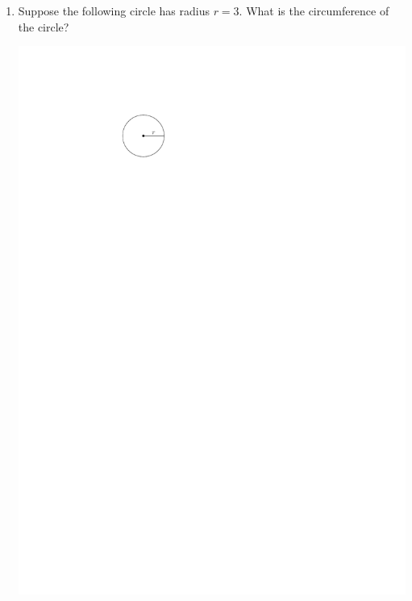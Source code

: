 \documentclass[12pt]{amsart}
\begin{document}
\begin{enumerate}
\begin{enumerate}
\end{enumerate}


\def \radi{3}\def \circumf{9}

 
\item Suppose the following circle has radius $r= \radi$. What is the circumference of the circle?
\vspace{2mm}

\includegraphics[scale = 0.8]{circle}

\vspace{1cm}
\newpage  $ $   \newpage\end{enumerate}\graphicspath{{/Users/jilan/Downloads/Randomizer/Randomizer/Sample Course/Sample Assessment/}}\setcounter{page}{1}


\thispagestyle{fancy}
\end{document}
